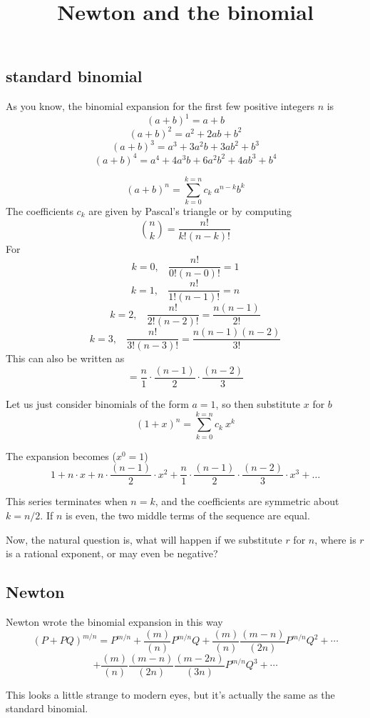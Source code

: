 \documentclass[11pt, oneside]{article}
\title{Newton and the binomial}
\date{}
\begin{document}
\maketitle
\Large


\subsection*{standard binomial}

As you know, the binomial expansion for the first few positive integers $n$ is
\[ (a+b)^1 = a + b \]
\[ (a+b)^2 = a^2 + 2ab + b^2 \]
\[ (a+b)^3 = a^3 + 3a^2b + 3ab^2 + b^3 \]
\[ (a+b)^4 = a^4 + 4a^3b + 6a^2b^2 + 4ab^3 + b^4 \]

\[ (a + b)^n = \sum_{k=0}^{k=n} c_k \ a^{n-k} b^{k} \]
The coefficients $c_k$ are given by Pascal's triangle or by computing
\[ \binom{n}{k} = \frac{n!}{k!(n-k)!}  \]
For 
\[ k = 0, \ \ \ \ \frac{n!}{0!(n-0)!} = 1 \]
\[ k = 1, \ \ \ \ \frac{n!}{1!(n-1)!} = n \]
\[ k = 2, \ \ \ \ \frac{n!}{2!(n-2)!} = \frac{n(n-1)}{2!} \]
\[ k = 3, \ \ \ \ \frac{n!}{3!(n-3)!} = \frac{n(n-1)(n-2)}{3!} \]
This can also be written as
\[ = \frac{n}{1} \cdot \frac{(n-1)}{2} \cdot \frac{(n-2)}{3} \]

Let us just consider binomials of the form $a = 1$, so then substitute $x$ for $b$
\[ (1 + x)^n = \sum_{k=0}^{k=n} c_k \ x^k \]

The expansion becomes ($x^0 = 1$)
\[ 1 + n \cdot x + n \cdot \frac{(n-1)}{2} \cdot x^2 + \frac{n}{1} \cdot \frac{(n-1)}{2} \cdot \frac{(n-2)}{3} \cdot x^3 + \dots \]

This series terminates when $n = k$, and the coefficients are symmetric about $k=n/2$.  If $n$ is even, the two middle terms of the sequence are equal.

Now, the natural question is, what will happen if we substitute $r$ for $n$, where is $r$ is a rational exponent, or may even be negative?

\subsection*{Newton}

Newton wrote the binomial expansion in this way
\[ (P + PQ)^{m/n} = P^{m/n} + \frac{(m)}{(n)}P^{m/n}Q + \frac{(m)}{(n)}\frac{(m-n)}{(2n)}P^{m/n}Q^2 + \cdots \]
\[ + \frac{(m)}{(n)}\frac{(m-n)}{(2n)}\frac{(m-2n)}{(3n)}P^{m/n}Q^3 + \cdots \] 

This looks a little strange to modern eyes, but it's actually the same as the standard binomial. 
\end{document}
